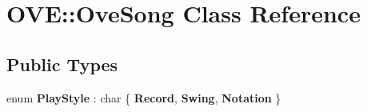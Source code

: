 \hypertarget{class_o_v_e_1_1_ove_song}{}\section{O\+VE\+:\+:Ove\+Song Class Reference}
\label{class_o_v_e_1_1_ove_song}
\subsection*{Public Types}
\begin{DoxyCompactItemize}
\item 
\mbox{\label{class_o_v_e_1_1_ove_song_a65b5de3dbd89ce152e8a1d7d385770aa}} 
enum {\bfseries Play\+Style} \+: char \{ {\bfseries Record}, 
{\bfseries Swing}, 
{\bfseries Notation}
 \}
\end{DoxyCompactItemize}
